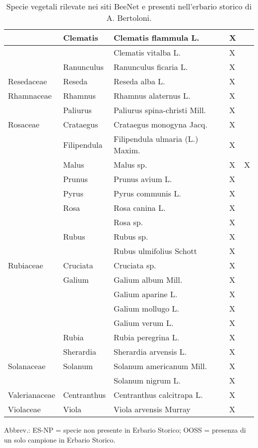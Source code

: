 \documentclass[main.tex]{subfiles}
\begin{document}
\begin{table}[!ht]
\begin{tabular}[\footnotesize]{|p{2.4cm}|p{1.9cm}|p{5.8cm}|p{1.1cm}|p{1cm}|}
        ~ & Clematis & Clematis flammula L. & X & ~ \\ \hline
        ~ & ~ & Clematis vitalba L. & X & ~ \\ \hline
        ~ & Ranunculus & Ranunculus ficaria L. & X & ~ \\ \hline
        Resedaceae & Reseda & Reseda alba L. & X & ~ \\ \hline
        Rhamnaceae & Rhamnus & Rhamnus alaternus L. & X & ~ \\ \hline
        ~ & Paliurus & Paliurus spina-christi Mill. & X & ~ \\ \hline
        Rosaceae & Crataegus & Crataegus monogyna Jacq. & X & ~ \\ \hline
        ~ & Filipendula & Filipendula ulmaria (L.) Maxim. & X & ~ \\ \hline
        ~ & Malus & Malus sp. & X & X \\ \hline
        ~ & Prunus & Prunus avium L. & X & ~ \\ \hline
        ~ & Pyrus & Pyrus communis L. & X & ~ \\ \hline
        ~ & Rosa & Rosa canina L. & X & ~ \\ \hline
        ~ & ~ & Rosa sp. & X & ~ \\ \hline
        ~ & Rubus & Rubus sp. & X & ~ \\ \hline
        ~ & ~ & Rubus ulmifolius Schott & X & ~ \\ \hline
        Rubiaceae & Cruciata & Cruciata sp. & X & ~ \\ \hline
        ~ & Galium & Galium album Mill. & X & ~ \\ \hline
        ~ & ~ & Galium aparine L. & X & ~ \\ \hline
        ~ & ~ & Galium mollugo L. & X & ~ \\ \hline
        ~ & ~ & Galium verum L. & X & ~ \\ \hline
        ~ & Rubia & Rubia peregrina L. & X & ~ \\ \hline
        ~ & Sherardia & Sherardia arvensis L. & X & ~ \\ \hline
        Solanaceae & Solanum & Solanum americanum Mill. & X & ~ \\ \hline
        ~ & ~ & Solanum nigrum L. & X & ~ \\ \hline
        Valerianaceae & Centranthus & Centranthus calcitrapa L. & X & ~ \\ \hline
        Violaceae & Viola & Viola arvensis Murray & X \\ \hline
    \end{tabular}
        \caption{Specie vegetali rilevate nei siti BeeNet e presenti nell’erbario storico di A. Bertoloni.}
    \label{tab:12}
\end{table}

Abbrev.: ES-NP = specie non presente in Erbario Storico; OOSS = presenza di un solo campione in Erbario Storico.

\clearpage
\end{document}
